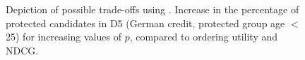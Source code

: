 \begin{figure}[t!]
	\centering
	\vspace{-2mm}
	\caption{ Depiction of possible trade-offs using \algoFAIR. Increase in the percentage of protected candidates in D5 (German credit, protected group age $<$ 25) for increasing values of $p$, compared to %
		ordering utility and NDCG.}
	\vspace{-\baselineskip}
	\label{fig:results-moving-p}
\end{figure}
